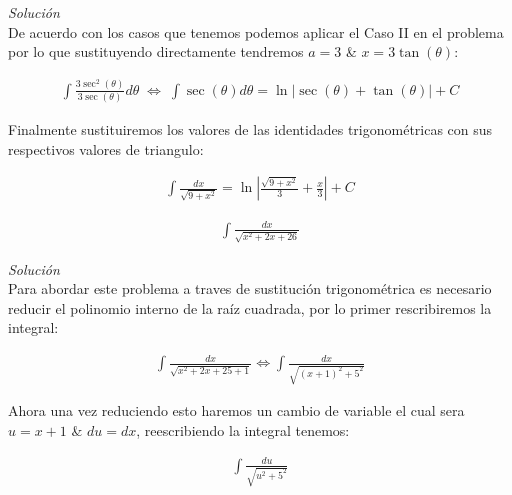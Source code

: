\textit{Solución}\\

De acuerdo con los casos que tenemos podemos aplicar el Caso II en el problema por lo que sustituyendo directamente tendremos \(\displaystyle a=3\) \& \(\displaystyle x=3\tan(\theta)\):

\begin{equation*}
    \begin{gathered}
        \int \frac{3\sec^{2}(\theta)}{3\sec(\theta)}d\theta \; \Leftrightarrow \; \int \sec(\theta)d\theta = \ln\left|\sec(\theta)+\tan(\theta)\right|+C
    \end{gathered}
\end{equation*}

Finalmente sustituiremos los valores de las identidades trigonométricas con sus respectivos valores de triangulo:

\begin{equation*}
    \begin{gathered}
        \int \frac{dx}{\sqrt{9+x^{2}}}= \ln\left|\frac{\sqrt{9+x^{2}}}{3}+\frac{x}{3}\right|+C
    \end{gathered}
\end{equation*}

\vspace{1cm}

\begin{equation}
    \begin{gathered}
        \int\frac{dx}{\sqrt{x^{2}+2x+26}}
    \end{gathered}
\end{equation}

\textit{Solución}\\

Para abordar este problema a traves de sustitución trigonométrica es necesario reducir el polinomio interno de la raíz cuadrada, por lo primer rescribiremos la integral:

\begin{equation*}
    \begin{gathered}
        \int \frac{dx}{\sqrt{x^{2}+2x+25+1}}\Leftrightarrow \int \frac{dx}{\sqrt{(x+1)^{2}+5^{2}}}
    \end{gathered}
\end{equation*}

Ahora una vez reduciendo esto haremos un cambio de variable el cual sera \(\displaystyle u=x+1\) \& \(\displaystyle du=dx\), reescribiendo la integral tenemos:

\begin{equation*}
    \begin{gathered}
        \int \frac{du}{\sqrt{u^{2}+5^{2}}}
    \end{gathered}
\end{equation*}

